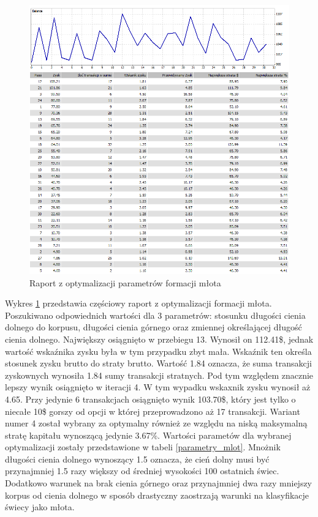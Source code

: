 \documentclass[pdflatex,11pt]{aghdpl}
\begin{document}
\begin{figure}[h!]
\begin{center}
\includegraphics[width=14cm]{hammer/optymalizacja.png}
\caption{Raport z optymalizacji parametrów formacji młota}
\label{opt_mlot}
\end{center}
\end{figure} 
Wykres \ref{opt_mlot} przedstawia częściowy raport z optymalizacji formacji młota. Poszukiwano odpowiednich wartości dla 3 parametrów: stosunku długości cienia dolnego do korpusu, długości cienia górnego oraz zmiennej określającej długość cienia dolnego. Największy osiągnięto w przebiegu 13. Wynosił on 112.41\$, jednak wartość wskaźnika zysku była w tym przypadku zbyt mała. Wskaźnik ten określa stosunek zysku brutto do straty brutto. Wartość 1.84 oznacza, że suma transakcji zyskownych wynosiła 1.84 sumy transakcji stratnych. Pod tym względem znacznie lepszy wynik osiągnięto w iteracji 4. W tym wypadku wskaxnik zysku wynosił aż 4.65. Przy jedynie 6 transakcjach osiągnięto wynik 103.70\$, który jest tylko o niecałe 10\$ gorszy od opcji w której przeprowadzono aż 17 transakcji. Wariant numer 4 został wybrany za optymalny również ze względu na niską maksymalną stratę kapitału wynoszącą jedynie 3.67\%. Wartości parametów dla wybranej optymalizacji zostały przedstawione w tabeli \ref{parametry_mlot}. Mnożnik długości cienia dolnego wynoszący 1.5 oznacza, że cień dolny musi być przynajmniej 1.5 razy większy od średniej wysokości 100 ostatnich świec. Dodatkowo warunek na brak cienia górnego oraz przynajmniej dwa razy mniejszy korpus od cienia dolnego w sposób drastyczny zaostrzają warunki na klasyfikacje świecy jako młota. 
\end{document}
